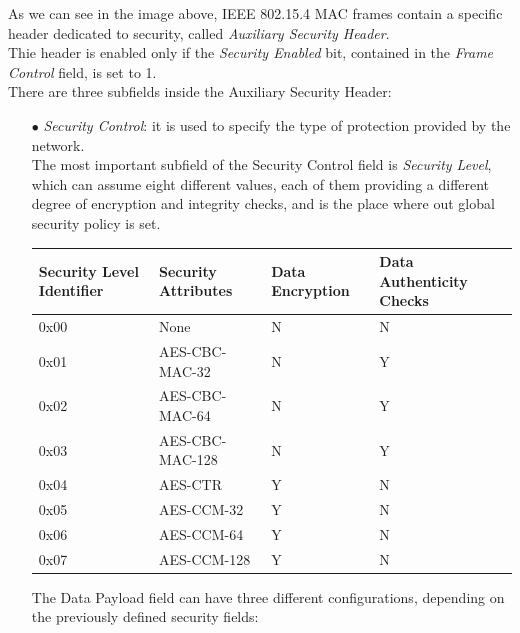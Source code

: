 \documentclass[12pt]{report}
\begin{document}
{As we can see in the image above, IEEE 802.15.4 MAC frames contain a specific header dedicated to security, called \emph{Auxiliary Security Header}.\\
Thie header is enabled only if the \emph{Security Enabled} bit, contained in the \emph{Frame Control} field, is set to 1.\\
There are three subfields inside the Auxiliary Security Header:

\begin{itemize}
\setlength{\itemindent}{+4mm}
\item[$\bullet$] \emph{Security Control}: it is used to specify the type of protection provided by the network.\\
The most important subfield of the Security Control field is \emph{Security Level}, which can assume eight different values, each of them providing a different degree of encryption and integrity checks, and is the place where out global security policy is set.

\begin{center}
\small
   \begin{tabular}{ | p{3cm} | l | l | p{3.5cm} |}
    \hline
    Security Level Identifier & Security Attributes & Data Encryption & Data Authenticity Checks \\ \hline
    0x00 & None & N & N \\ \hline
    0x01 & AES-CBC-MAC-32 & N & Y\\ \hline
    0x02 & AES-CBC-MAC-64 & N & Y \\ \hline
    0x03 & AES-CBC-MAC-128 & N & Y\\ \hline
    0x04 & AES-CTR & Y & N\\ \hline
    0x05 & AES-CCM-32 & Y & N\\ \hline
    0x06 & AES-CCM-64 & Y & N\\ \hline
    0x07 & AES-CCM-128 & Y &N\\ \hline
    \end{tabular}
\end{center}
\bigskip
The Data Payload field can have three different configurations, depending on the previously defined security fields:


\end{itemize}}
\end{document}
